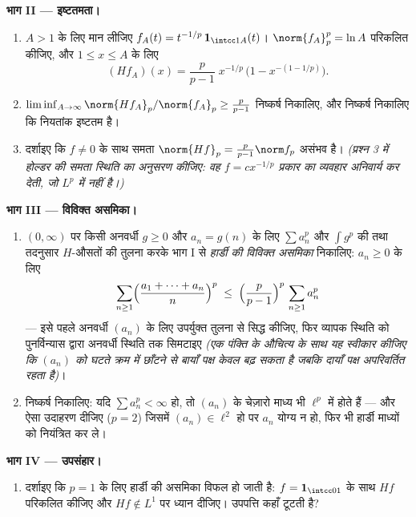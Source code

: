 \begin{problem}
\medskip
\noindent\textbf{भाग II --- इष्टतमता।}
\begin{enumerate}[resume]
  \item $A > 1$ के लिए मान लीजिए $f_A(t) = t^{-1/p}\,\mathbf
        1_{\intcc1A}(t)$। $\norm{f_A}_p^p = \ln A$ परिकलित कीजिए, और
        $1 \leq x \leq A$ के लिए
        \[
        (Hf_A)(x) = \frac p{p-1}\;x^{-1/p}\,
        \bigl(1 - x^{-(1 - 1/p)}\bigr).
        \]
  \item $\liminf_{A\to\infty} \norm{Hf_A}_p/
        \norm{f_A}_p \geq \frac{p}{p-1}$ निष्कर्ष निकालिए, और निष्कर्ष निकालिए कि नियतांक
        इष्टतम है।
  \item दर्शाइए कि $f \neq 0$ के साथ समता $\norm{Hf}_p = \frac
        p{p-1}\norm f_p$ असंभव है। \emph{(प्रश्न
        3 में होल्डर की समता स्थिति का अनुसरण कीजिए: वह $f = cx^{-1/p}$
        प्रकार का व्यवहार अनिवार्य कर देती, जो $L^p$ में नहीं
        है।)}
\end{enumerate}

\medskip
\noindent\textbf{भाग III --- विविक्त असमिका।}
\begin{enumerate}[resume]
  \item $(0,\infty)$ पर किसी अनवर्धी $g \geq 0$ और $a_n = g(n)$ के लिए $\sum a_n^p$ और
        $\int g^p$ की तथा तदनुसार $H$-औसतों की तुलना करके भाग I से
        \emph{हार्डी की विविक्त असमिका} निकालिए: $a_n \geq 0$ के लिए
        \[
        \sum_{n\geq1}\Bigl(\frac{a_1 + \dots +
        a_n}{n}\Bigr)^{p}
        \;\leq\;
        \Bigl(\frac{p}{p-1}\Bigr)^{p}\,\sum_{n\geq1}a_n^p
        \]
        --- इसे पहले अनवर्धी $(a_n)$ के लिए उपर्युक्त तुलना से सिद्ध
        कीजिए, फिर व्यापक स्थिति को पुनर्विन्यास द्वारा अनवर्धी
        स्थिति तक सिमटाइए \emph{(एक पंक्ति के औचित्य के साथ यह
        स्वीकार कीजिए कि $(a_n)$ को घटते क्रम में छाँटने से बायाँ
        पक्ष केवल बढ़ सकता है जबकि दायाँ पक्ष अपरिवर्तित रहता
        है)}।
  \item निष्कर्ष निकालिए: यदि $\sum a_n^p < \infty$ हो, तो $(a_n)$ के चेज़ारो माध्य
        भी $\ell^p$ में होते हैं --- और ऐसा उदाहरण दीजिए ($p = 2$)
        जिसमें $(a_n) \in \ell^2$ हो पर $a_n$ योग्य न हो, फिर भी हार्डी माध्यों
        को नियंत्रित कर ले।
\end{enumerate}

\medskip
\noindent\textbf{भाग IV --- उपसंहार।}
\begin{enumerate}[resume]
  \item दर्शाइए कि $p = 1$ के लिए हार्डी की असमिका विफल हो जाती है:
        $f = \mathbf 1_{\intcc01}$ के साथ $Hf$ परिकलित कीजिए और $Hf \notin L^1$ पर ध्यान दीजिए।
        उपपत्ति कहाँ टूटती है?
\end{enumerate}


\end{problem}
